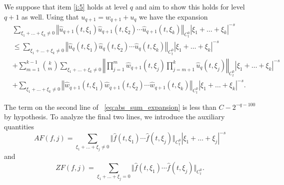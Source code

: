 \documentclass[12pt,reqno,letterpaper]{amsart}
\numberwithin{equation}{section}
\newcommand{\1}{{\bf 1}}
\newcommand{\2}{{\bf 2}}
\theoremstyle{remark}
\theoremstyle{remark}
\begin{document}
We suppose that item \ref{i:5} holds at level $q$ and aim to show this holds for level $q+1$ as well. Using that $u_{q+1} = w_{q+1} + u_q$ we have the expansion
\begin{equation}\label{eq:abs_sum_expansion}
    \begin{split}
        & \sum_{\xi_1 + \ldots + \xi_k \not = 0} \left\Vert  \hat{u}_{q+1}(t,\xi_1) \hat{u}_{q+1}(t,\xi_2) \cdots \hat{u}_{q+1}(t,\xi_k) \right\Vert_{C_t^0}|\xi_1 + \ldots + \xi_k|^{-s}\\
        &\leq \sum_{\xi_1 + \ldots + \xi_k \not = 0} \left\Vert  \hat{u}_{q}(t,\xi_1) \hat{u}_{q}(t,\xi_2) \cdots \hat{u}_{q}(t,\xi_k) \right\Vert_{C_t^0}|\xi_1 + \ldots + \xi_k|^{-s}\\
        &+ \sum_{m=1}^{k-1} \binom{k}{m} \sum_{\xi_1 + \ldots + \xi_k \not=0} \left\Vert \prod_{j=1}^m \hat{w}_{q+1}(t,\xi_j) \prod_{j=m+1}^k \hat{u}_q(t,\xi_j)\right\Vert_{C_t^0} |\xi_1 + \ldots + \xi_k|^{-s}\\
        &+ \sum_{\xi_1 + \ldots + \xi_k \not=0} \left\Vert \hat{w}_{q+1}(t,\xi_1) \hat{w}_{q+1}(t,\xi_2) \cdots \hat{w}_{q+1}(t,\xi_k)\right\Vert_{C_t^0} |\xi_1 + \ldots + \xi_k|^{-s}.
    \end{split}
\end{equation}



The term on the second line of ~\eqref{eq:abs_sum_expansion} is less than $C - 2^{-q-100}$ by hypothesis. To analyze the final two lines, we introduce the auxiliary quantities
\begin{equation*}
    AF(f,j) = \sum_{\xi_1 + \ldots+ \xi_j \not=0} \Vert \hat{f}(t,\xi_1) \cdots \hat{f}(t,\xi_j)\Vert_{C_t^0} |\xi_1 + \ldots + \xi_j|^{-s}
\end{equation*}
and
\begin{equation*}
    ZF(f,j) = \sum_{\xi_1 + \ldots+ \xi_j =0} \Vert \hat{f}(t,\xi_1) \cdots \hat{f}(t,\xi_j)\Vert_{C_t^0}.
\end{equation*}
\end{document}
